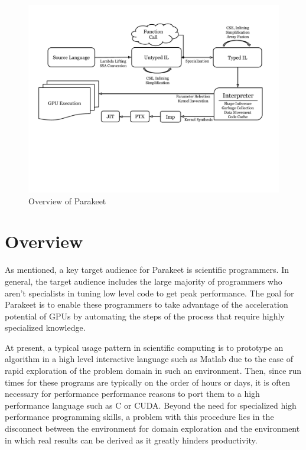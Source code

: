 \documentclass[preprint]{sigplanconf}
\begin{document}
\begin{figure}[t!bh]
\begin{center}
\leavevmode
\includegraphics[scale=0.6, trim=10pt 180pt 10pt 120pt]{Pipeline.pdf}
\end{center}
\caption{Overview of Parakeet}
\label{fig:overview}
\end{figure}
\section{Overview}
\label{overview}

As mentioned, a key target audience for Parakeet is scientific programmers. In general, the target audience includes the large majority of programmers who aren't specialists in tuning low level code to get peak performance.  The goal for Parakeet is to enable these programmers to take advantage of the acceleration potential of GPUs by automating the steps of the process that require highly specialized knowledge.

At present, a typical usage pattern in scientific computing is to prototype an algorithm in a high level interactive language such as Matlab due to the ease of rapid exploration of the problem domain in such an environment.  Then, since run times for these programs are typically on the order of hours or days, it is often necessary for performance performance reasons to port them to a high performance language such as C or CUDA.  Beyond the need for specialized high performance programming skills, a problem with this procedure  lies in the disconnect between the environment for domain exploration and the environment in which real results can be derived as it greatly hinders productivity.
\end{document}
